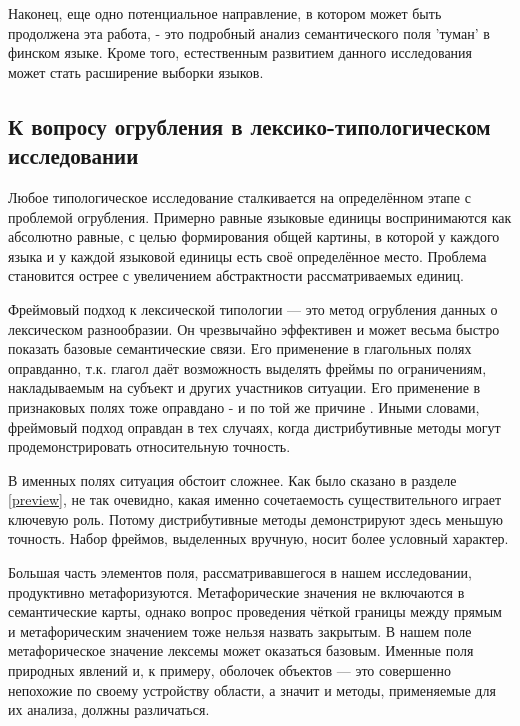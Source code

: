 \par Наконец, еще одно потенциальное направление, в котором может быть продолжена эта работа, - это подробный анализ семантического поля 'туман' в финском языке. Кроме того, естественным развитием данного исследования может стать расширение выборки языков.

\subsection{К вопросу огрубления в лексико-типологическом исследовании} \label{final2}

\par Любое типологическое исследование сталкивается на определённом этапе с проблемой огрубления. Примерно равные языковые единицы воспринимаются как абсолютно равные, с целью формирования общей картины, в которой у каждого языка и у каждой языковой единицы есть своё определённое место. Проблема становится острее с увеличением абстрактности рассматриваемых единиц. 

\par Фреймовый подход к лексической типологии --- это метод огрубления данных о лексическом разнообразии. Он чрезвычайно эффективен и может весьма быстро показать базовые семантические связи. Его применение в глагольных полях оправданно, т.к. глагол даёт возможность выделять фреймы по ограничениям, накладываемым на субъект и других участников ситуации. Его применение в признаковых полях тоже оправдано - и по той же причине . Иными словами, фреймовый подход оправдан в тех случаях, когда дистрибутивные методы могут продемонстрировать относительную точность. 

\par В именных полях ситуация обстоит сложнее. Как было сказано в разделе \ref{preview}, не так очевидно, какая именно сочетаемость существительного играет ключевую роль. Потому дистрибутивные методы демонстрируют здесь меньшую точность. Набор фреймов, выделенных вручную, носит более условный характер.

\par Большая часть элементов поля, рассматривавшегося в нашем исследовании, продуктивно метафоризуются. Метафорические значения не включаются в семантические карты, однако вопрос проведения чёткой границы между прямым и метафорическим значением тоже нельзя назвать закрытым. В нашем поле метафорическое значение лексемы может оказаться базовым. Именные поля природных явлений и, к примеру, оболочек объектов --- это совершенно непохожие по своему устройству области, а значит и методы, применяемые для их анализа, должны различаться. 

